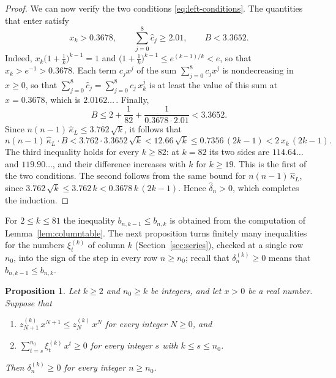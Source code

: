 \documentclass{amsart}
\makeatletter
\newtheorem{proposition}[theorem]{Proposition}
\theoremstyle{definition}
\theoremstyle{remark}
\numberwithin{equation}{section}
\def\subsection{\@startsection{subsection}{2}\z@{.5\linespacing\@plus.7\linespacing}{-.5em}{\normalfont\bfseries\boldmath}}
\makeatother
\begin{document}
\begin{proof}
We can now verify the two conditions \eqref{eq:left-conditions}. The quantities that enter satisfy
\[
x_k>0.3678,\qquad\sum_{j=0}^{8}\hat c_j\ge 2.01,\qquad B<3.3652 .
\]
Indeed, $x_k\bigl(1+\frac1k\bigr)^{k-1}=1$ and $\bigl(1+\frac1k\bigr)^{k-1}\le e^{(k-1)/k}<e$, so that $x_k>e^{-1}>0.3678$. Each term $c_jx^{j}$ of the sum $\sum_{j=0}^{8}c_jx^{j}$ is nondecreasing in $x\ge 0$, so that $\sum_{j=0}^{8}\hat c_j=\sum_{j=0}^{8}c_j\,x_k^{j}$ is at least the value of this sum at $x=0.3678$, which is $2.0162\ldots$\,. Finally,
\[
B\le 2+\frac{1}{82}+\frac{1}{0.3678\cdot 2.01}<3.3652 .
\]
Since $n(n-1)\,\hat\kappa_L\le 3.762\,\sqrt k$, it follows that
\[
n(n-1)\,\hat\kappa_L\cdot B<3.762\cdot 3.3652\,\sqrt k<12.66\,\sqrt k\le 0.7356\,(2k-1)<2\,x_k\,(2k-1).
\]
The third inequality holds for every $k\ge 82$: at $k=82$ its two sides are $114.64\ldots$ and $119.90\ldots$, and their difference increases with $k$ for $k\ge 19$. This is the first of the two conditions. The second follows from the same bound for $n(n-1)\,\hat\kappa_L$, since $3.762\,\sqrt k\le 3.762\,k<0.3678\,k\,(2k-1)$. Hence $\hat\delta_n>0$, which completes the induction.
\end{proof}

\subsection{Columns $2\le k\le 81$}\label{subsec:left-small}

For $2\le k\le 81$ the inequality $b_{n,k-1}\le b_{n,k}$ is obtained from the computation of Lemma~\ref{lem:columntable}. The next proposition turns finitely many inequalities for the numbers $\xi^{(k)}_t$ of column $k$ (Section~\ref{sec:series}), checked at a single row $n_0$, into the sign of the step in every row $n\ge n_0$; recall that $\delta^{(k)}_n\ge 0$ means that $b_{n,k-1}\le b_{n,k}$.

\begin{proposition}\label{prop:propagation}
Let $k\ge 2$ and $n_0\ge k$ be integers, and let $x>0$ be a real number. Suppose that
\begin{enumerate}
\item $z^{(k)}_{N+1}\,x^{N+1}\le z^{(k)}_N\,x^{N}$ for every integer $N\ge 0$, and
\item $\sum_{t=s}^{n_0}\xi^{(k)}_t\,x^{t}\ge 0$ for every integer $s$ with $k\le s\le n_0$.
\end{enumerate}
Then $\delta^{(k)}_n\ge 0$ for every integer $n\ge n_0$.
\end{proposition}
\end{document}
